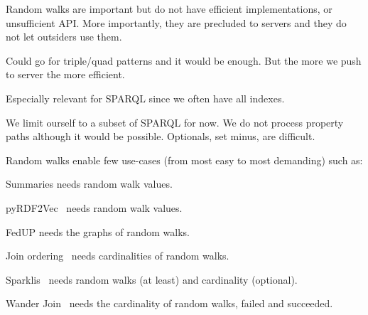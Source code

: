 Random walks are important but do not have efficient implementations,
or unsufficient API. More importantly, they are precluded to servers
and they do not let outsiders use them.

Could go for triple/quad patterns and it would be enough. But the more
we push to server the more efficient.

Especially relevant for SPARQL since we often have all indexes.

We limit ourself to a subset of SPARQL for now. We do not process
property paths although it would be possible. Optionals, set minus, are
difficult.


Random walks enable few use-cases (from most easy to most demanding)
such as:
\begin{asparadesc}
\item [Summaries] needs random walk values.
\item [pyRDF2Vec~\cite{steenwinckel2023pyrdf2vec}] needs random walk values.
\item [FedUP] needs the graphs of random walks.
\item [Join ordering~\REF] needs cardinalities of random walks.
\item [Sparklis~\cite{ferre2017sparklis}] needs random walks (at
  least) and cardinality (optional).
\item [Wander Join~\cite{li2016wanderjoin}] needs the cardinality of
  random walks, failed and succeeded.
\end{asparadesc}

